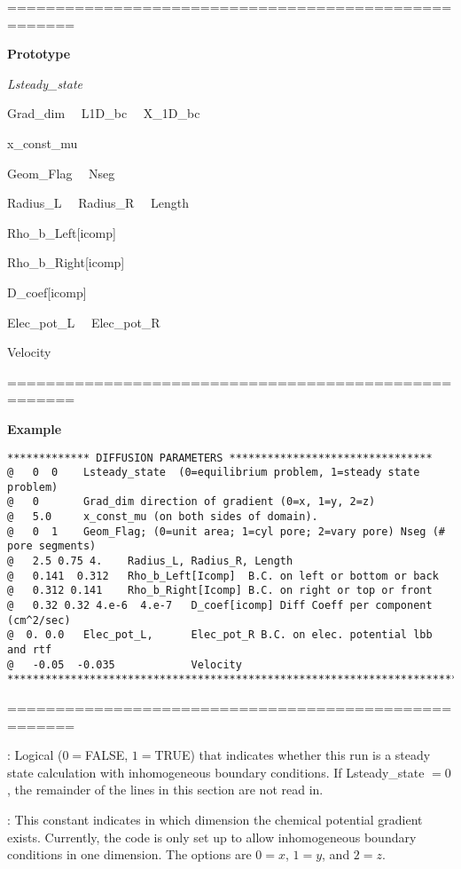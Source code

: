 \documentclass[10pt,onecolumn]{article}
\begin{document}
\noindent=====================================================

{\bf Prototype}

{\it Lsteady\_state

Grad\_dim \ \  L1D\_bc \ \ X\_1D\_bc


x\_const\_mu

Geom\_Flag \ \ Nseg

Radius\_L \ \  Radius\_R \ \  Length

Rho\_b\_Left[icomp]

Rho\_b\_Right[icomp]


D\_coef[icomp]

Elec\_pot\_L \ \ Elec\_pot\_R

Velocity
}

\noindent=====================================================

{\bf Example}

\begin{verbatim}
************* DIFFUSION PARAMETERS ********************************
@   0  0    Lsteady_state  (0=equilibrium problem, 1=steady state problem)
@   0       Grad_dim direction of gradient (0=x, 1=y, 2=z)
@   5.0     x_const_mu (on both sides of domain).
@   0  1    Geom_Flag; (0=unit area; 1=cyl pore; 2=vary pore) Nseg (# pore segments)
@   2.5 0.75 4.    Radius_L, Radius_R, Length
@   0.141  0.312   Rho_b_Left[Icomp]  B.C. on left or bottom or back
@   0.312 0.141    Rho_b_Right[Icomp] B.C. on right or top or front
@   0.32 0.32 4.e-6  4.e-7   D_coef[icomp] Diff Coeff per component (cm^2/sec)
@  0. 0.0   Elec_pot_L,      Elec_pot_R B.C. on elec. potential lbb and rtf
@   -0.05  -0.035            Velocity
***********************************************************************
\end{verbatim}

\noindent=====================================================
\vspace{0.1in}


\vspace{0.1in}
:
Logical ($0=$FALSE, $1=$TRUE) that indicates whether this run is a
steady state calculation with inhomogeneous boundary conditions.
If Lsteady\_state $=0$, the remainder of the lines in this section
are not read in.

\vspace{0.1in}
:  This constant indicates in which
dimension the chemical potential gradient exists.  Currently, the
code is only set up to allow inhomogeneous boundary conditions in
one dimension.  The options are $0=x$, $1=y$, and $2=z$.
\end{document}
